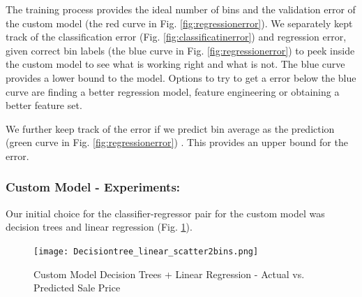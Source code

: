 \documentclass[conference,compsoc]{IEEEtran}
\begin{document}
\par
The training process provides the ideal number of bins and the validation error of the custom model (the red curve in Fig. \ref{fig:regressionerror}). We separately kept track of the classification error (Fig. \ref{fig:classificatinerror}) and regression error, given correct bin labels (the blue curve in Fig. \ref{fig:regressionerror}) to peek inside the custom model to see what is working right and what is not. The blue curve provides a lower bound to the model. Options to try to get a error below the blue curve are finding a better regression model, feature engineering or obtaining a better feature set.

\par
We further keep track of the error if we predict bin average as the prediction (green curve in Fig. \ref{fig:regressionerror}) . This provides an upper bound for the error.


\subsubsection{Custom Model - Experiments:} 
\par
Our initial choice for the classifier-regressor pair for the custom model was decision trees and linear regression (Fig. \ref{fig:customDtLr}).

\begin{figure}[!h]
  \texttt{[image: Decisiontree\_linear\_scatter2bins.png]}
  \caption{Custom Model Decision Trees + Linear Regression - Actual vs. Predicted Sale Price}
  \label{fig:customDtLr}
\end{figure}
\end{document}
